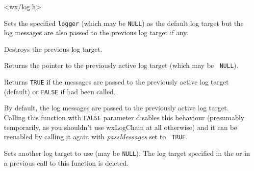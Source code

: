 


<wx/log.h>


\label{wxlogchainwxlogchain}


Sets the specified {\tt logger} (which may be {\tt NULL}) as the default log
target but the log messages are also passed to the previous log target if any.



Destroys the previous log target.

\label{wxlogchaingetoldlog}


Returns the pointer to the previously active log target (which may be {\tt
NULL}).

\label{wxlogchainispassingmessages}


Returns {\tt TRUE} if the messages are passed to the previously active log
target (default) or {\tt FALSE} if 
had been called.

\label{wxlogchainpassmessages}


By default, the log messages are passed to the previously active log target.
Calling this function with {\tt FALSE} parameter disables this behaviour
(presumably temporarily, as you shouldn't use wxLogChain at all otherwise) and
it can be reenabled by calling it again with {\it passMessages} set to {\tt
TRUE}.

\label{wxlogchainsetlog}


Sets another log target to use (may be {\tt NULL}). The log target specified
in the  or in a previous call to
this function is deleted.


